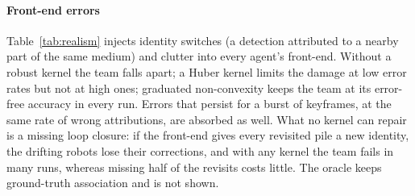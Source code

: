 \paragraph{Front-end errors}
Table~\ref{tab:realism} injects identity switches (a detection attributed to a nearby part of
the same medium) and clutter into every agent's front-end. Without a robust kernel the team
falls apart; a Huber kernel limits the damage at low error rates but not at high ones;
graduated non-convexity keeps the team at its error-free accuracy in every run. Errors that
persist for a burst of keyframes, at the same rate of wrong attributions, are absorbed as well.
What no kernel can repair is a missing loop closure: if the front-end gives every revisited
pile a new identity, the drifting robots lose their corrections, and with any kernel the team
fails in many runs, whereas missing half of the revisits costs little. The oracle keeps ground-truth association and is not shown.

\begin{table}[t]
  \centering
  \caption{Team ATE [m] of \avatar{} under front-end errors (identity-switch rate + clutter
  per keyframe and sensor; ``in bursts'': a switch lasts 25 keyframes; ``split'': a part seen
  again after 30 keyframes gets a new identity) for three kernels on the landmark
  observations (Tier-1 simulation, 600\,s, M64, 20 seeds): median / mean; in brackets, runs
  that failed (the team did not merge, or its ATE exceeds 1\,m).}
  \label{tab:realism}
  \footnotesize
\end{table}

